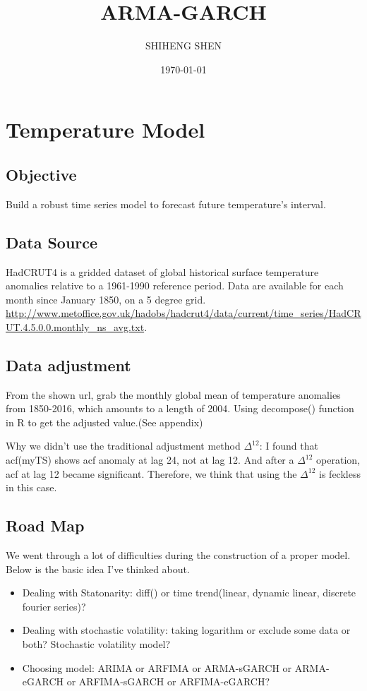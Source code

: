 \documentclass[a4paper,10pt]{article}
\title{ARMA-GARCH}
\author{SHIHENG SHEN}
\date{\today}
\begin{document}
\maketitle

\section{Temperature Model}
\subsection{Objective}
Build a robust time series model to forecast future temperature's interval. 


\subsection{Data Source}
HadCRUT4 is a gridded dataset of global historical surface temperature anomalies relative to a 1961-1990 reference period. Data are available for each month since January 1850, on a 5 degree grid. \url{http://www.metoffice.gov.uk/hadobs/hadcrut4/data/current/time_series/HadCRUT.4.5.0.0.monthly_ns_avg.txt}.

\subsection{Data adjustment}
From the shown url, grab the monthly global mean of temperature anomalies from 1850-2016, which amounts to a length of 2004. Using decompose() function in R to get the adjusted value.(See appendix)  \par
Why we didn't use the traditional adjustment method $\Delta^{12}$: I found that acf(myTS) shows acf anomaly at lag 24, not at lag 12. And after a $\Delta^{12}$ operation, acf at lag 12 became significant. Therefore, we think that using the $\Delta^{12}$ is feckless in this case.


\subsection{Road Map}
We went through a lot of difficulties during the construction of a proper model. Below is the basic idea I've thinked about.\par
\begin{itemize}
\item Dealing with Statonarity: diff() or time trend(linear, dynamic linear, discrete fourier series)?
\item Dealing with stochastic volatility: taking logarithm or exclude some data or both? Stochastic volatility model?
\item Choosing model: ARIMA or ARFIMA or ARMA-sGARCH or ARMA-eGARCH or ARFIMA-sGARCH or ARFIMA-eGARCH?
\end{itemize}
\end{document}

